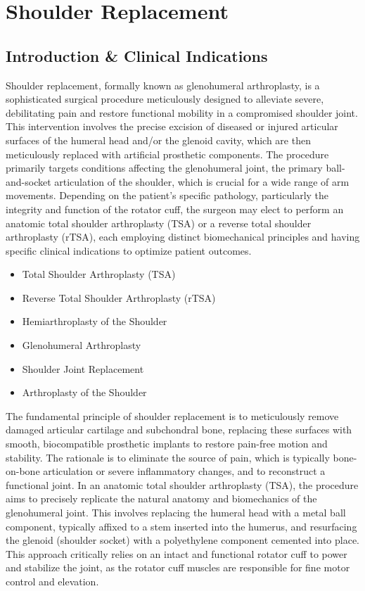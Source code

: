 \chapter{Shoulder Replacement}

\section*{Introduction \& Clinical Indications}
Shoulder replacement, formally known as glenohumeral arthroplasty, is a sophisticated surgical procedure meticulously designed to alleviate severe, debilitating pain and restore functional mobility in a compromised shoulder joint. This intervention involves the precise excision of diseased or injured articular surfaces of the humeral head and/or the glenoid cavity, which are then meticulously replaced with artificial prosthetic components. The procedure primarily targets conditions affecting the glenohumeral joint, the primary ball-and-socket articulation of the shoulder, which is crucial for a wide range of arm movements. Depending on the patient's specific pathology, particularly the integrity and function of the rotator cuff, the surgeon may elect to perform an anatomic total shoulder arthroplasty (TSA) or a reverse total shoulder arthroplasty (rTSA), each employing distinct biomechanical principles and having specific clinical indications to optimize patient outcomes.

\begin{itemize}
  \item Total Shoulder Arthroplasty (TSA)
  \item Reverse Total Shoulder Arthroplasty (rTSA)
  \item Hemiarthroplasty of the Shoulder
  \item Glenohumeral Arthroplasty
  \item Shoulder Joint Replacement
  \item Arthroplasty of the Shoulder
\end{itemize}

The fundamental principle of shoulder replacement is to meticulously remove damaged articular cartilage and subchondral bone, replacing these surfaces with smooth, biocompatible prosthetic implants to restore pain-free motion and stability. The rationale is to eliminate the source of pain, which is typically bone-on-bone articulation or severe inflammatory changes, and to reconstruct a functional joint. In an anatomic total shoulder arthroplasty (TSA), the procedure aims to precisely replicate the natural anatomy and biomechanics of the glenohumeral joint. This involves replacing the humeral head with a metal ball component, typically affixed to a stem inserted into the humerus, and resurfacing the glenoid (shoulder socket) with a polyethylene component cemented into place. This approach critically relies on an intact and functional rotator cuff to power and stabilize the joint, as the rotator cuff muscles are responsible for fine motor control and elevation.

